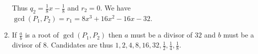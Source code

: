 \documentclass{article}
\begin{document}
\begin{enumerate}
    Thus $q_2 = \frac{1}{8}x - \frac{1}{8}$ and $r_2 = 0$. We have $\gcd(P_1, P_2) = r_1 = 8x^3 + 16x^2 - 16x - 32$.

    \item If $\frac{a}{b}$ is a root of $\gcd(P_1, P_2)$ then $a$ must be a divisor of $32$ and $b$ must be a divisor of $8$. Candidates are thus $1, 2, 4, 8, 16, 32, \frac{1}{2}, \frac{1}{4}, \frac{1}{8}$.
    
\end{enumerate}
\end{document}

